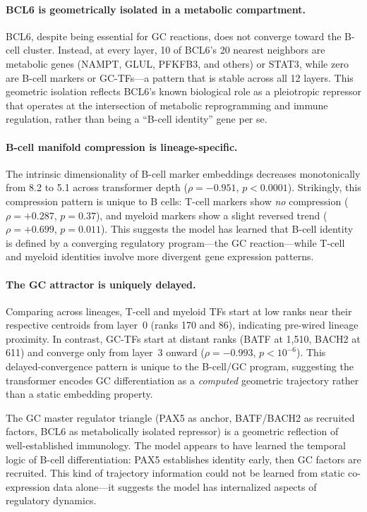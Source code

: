 \documentclass[10pt,twocolumn]{article}
\begin{document}
\paragraph{BCL6 is geometrically isolated in a metabolic compartment.}
BCL6, despite being essential for GC reactions, does not converge toward the B-cell cluster.
Instead, at every layer, 10 of BCL6's 20 nearest neighbors are metabolic genes (NAMPT, GLUL, PFKFB3, and others) or STAT3, while zero are B-cell markers or GC-TFs---a pattern that is stable across all 12 layers.
This geometric isolation reflects BCL6's known biological role as a pleiotropic repressor that operates at the intersection of metabolic reprogramming and immune regulation, rather than being a ``B-cell identity'' gene per se.

\paragraph{B-cell manifold compression is lineage-specific.}
The intrinsic dimensionality of B-cell marker embeddings decreases monotonically from 8.2 to 5.1 across transformer depth ($\rho = -0.951$, $p < 0.0001$).
Strikingly, this compression pattern is unique to B cells:
T-cell markers show \emph{no} compression ($\rho = +0.287$, $p = 0.37$), and myeloid markers show a slight reversed trend ($\rho = +0.699$, $p = 0.011$).
This suggests the model has learned that B-cell identity is defined by a converging regulatory program---the GC reaction---while T-cell and myeloid identities involve more divergent gene expression patterns.

\paragraph{The GC attractor is uniquely delayed.}
Comparing across lineages, T-cell and myeloid TFs start at low ranks near their respective centroids from layer~0 (ranks 170 and 86), indicating pre-wired lineage proximity.
In contrast, GC-TFs start at distant ranks (BATF at 1{,}510, BACH2 at 611) and converge only from layer~3 onward ($\rho = -0.993$, $p < 10^{-6}$).
This delayed-convergence pattern is unique to the B-cell/GC program, suggesting the transformer encodes GC differentiation as a \emph{computed} geometric trajectory rather than a static embedding property.

The GC master regulator triangle (PAX5 as anchor, BATF/BACH2 as recruited factors, BCL6 as metabolically isolated repressor) is a geometric reflection of well-established immunology.
The model appears to have learned the temporal logic of B-cell differentiation: PAX5 establishes identity early, then GC factors are recruited.
This kind of trajectory information could not be learned from static co-expression data alone---it suggests the model has internalized aspects of regulatory dynamics.
\end{document}
